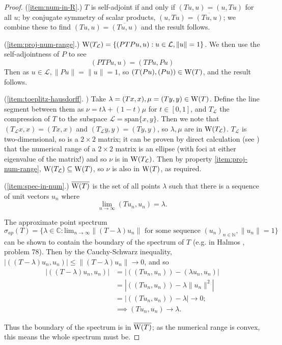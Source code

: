 \documentclass[../main.tex]{subfiles}
\begin{document}
\begin{proof}
(\ref{item:num-in-R}.) $T$ is self-adjoint if and only if $(Tu, u) = (u, Tu)$ for all $u$; by conjugate symmetry of scalar products, $(u, Tu) = \overline{(Tu, u)}$; we combine these to find $(Tu, u) = \overline{(Tu, u)}$ and the result follows. 

(\ref{item:proj-num-range}.) $\mathrm{W}(T_\mathcal{L}) = \{( PTPu, u ) : u \in \mathcal{L}, \|u\|=1\}$.
We then use the self-adjointness of $P$ to see
$$( PTPu, u ) = ( TPu, Pu )$$
Then as $u \in \mathcal{L}, \|Pu\| = \|u\| = 1$,
so $( T(Pu), (Pu) ) \in \mathrm{W}(T)$, and the result follows.

(\ref{item:toeplitz-hausdorff}. \cite{gustafson1997numerical}) Take $\lambda = (Tx, x), \mu = (Ty, y) \in \mathrm{W}(T)$. Define the line segment between them as 
$\nu = t\lambda + (1-t)\mu$ for $t \in [0, 1]$, and $T_\mathcal{L}$ the compression of $T$ to the subspace 
$\mathcal{L} = \text{span}\{x, y\}$. Then we note that $(T_\mathcal{L} x, x) = (Tx, x)$ and $(T_\mathcal{L} y, y) = (Ty, y)$, so $\lambda, \mu$ are in
$\mathrm{W}(T_\mathcal{L})$. $T_\mathcal{L}$ is two-dimensional, so is a $2 \times 2$ matrix; it can be proven by direct calculation (see \cite{gustafson1997numerical}) that the numerical range of a $2 \times 2$ matrix is an ellipse (with foci at either eigenvalue of the matrix!) and so $\nu$ is in $\mathrm{W}(T_\mathcal{L})$.
Then by property \ref{item:proj-num-range}, $\mathrm{W}(T_\mathcal{L}) \subseteq \mathrm{W}(T)$, so $\nu$ is also in $\mathrm{W}(T)$, as required.

(\ref{item:spec-in-num}.) $\overline{\mathrm{W}(T)}$ is the set of all points $\lambda$ such that there is a sequence of unit vectors $u_n$ where
$$\lim_{n\rightarrow \infty}( Tu_n, u_n ) = \lambda.$$

The approximate point spectrum
$\sigma_{ap}(T) = \{\lambda \in \mathbb{C}: \text{lim}_{n \rightarrow \infty}\|(T - \lambda)u_n\| \text{ for some sequence } (u_n)_{n \in \mathbb{N}}, \|u_n\| = 1\}$
can be shown to contain the boundary of the spectrum of $T$ (e.g. in Halmos \cite{halmos1982hilbert}, problem 78). Then by the Cauchy-Schwarz inequality,
$|( (T - \lambda)u_n, u_n )| \leq \|(T - \lambda)u_n\| \rightarrow 0$, and so
\begin{equation*}
\begin{split}
|( (T - \lambda)u_n, u_n )| &  = |( (Tu_n, u_n) ) - ( \lambda u_n, u_n )| \\
& = |( (Tu_n, u_n) ) - \lambda \|u_n\|^2| \\
& = |( (Tu_n, u_n) ) - \lambda| \rightarrow 0; \\
& \implies ( Tu_n, u_n ) \rightarrow \lambda.
\end{split}
\end{equation*}

Thus the boundary of the spectrum is in $\overline{\mathrm{W}(T)}$; as the numerical range is convex,
this means the whole spectrum must be. 
\end{proof}
\end{document}
